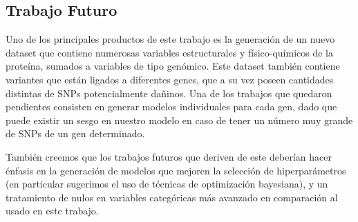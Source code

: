 \subsection{Trabajo Futuro}

Uno de los principales productos de este trabajo es la generación de un nuevo dataset que contiene numerosas variables estructurales y físico-químicos de la proteína, sumados a variables de tipo genómico. Este dataset también contiene variantes que están ligados a diferentes genes, que a su vez poseen cantidades distintas de SNPs potencialmente dañinos. Una de los trabajos que quedaron pendientes consisten en generar modelos individuales para cada gen, dado que puede existir un sesgo en nuestro modelo en caso de tener un número muy grande de SNPs de un gen determinado.

También creemos que los trabajos futuros que deriven de este deberían hacer énfasis en la generación de modelos que mejoren la selección de hiperparámetros (en particular sugerimos el uso de técnicas de optimización bayesiana), y un tratamiento de nulos en variables categóricas más avanzado en comparación al usado en este trabajo. 

\newpage

